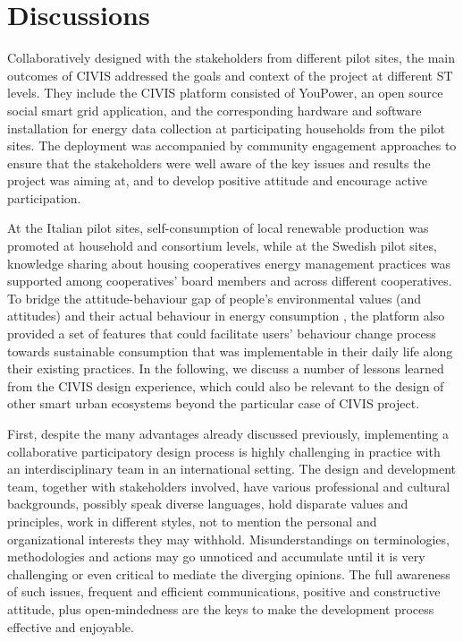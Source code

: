 
\section{Discussions}

Collaboratively designed with the stakeholders from different pilot sites, the main outcomes of CIVIS addressed the goals and context of the project at different ST levels. They include the CIVIS platform consisted of YouPower, an open source social smart grid application, and the corresponding hardware and software installation for energy data collection at participating households from the pilot sites. The   deployment was accompanied by community engagement approaches to ensure that the stakeholders were well aware of the key issues and results the project was aiming at, and to develop positive attitude and encourage active participation. 
% 

At the Italian pilot sites, self-consumption of local renewable production was promoted at household and consortium levels, while at the Swedish pilot sites, knowledge sharing about housing cooperatives energy management practices was supported among cooperatives' board members and across different cooperatives. To bridge the attitude-behaviour gap of people's environmental values (and attitudes) and their actual behaviour in energy consumption \cite{Kollmuss2002,Schultz2002,Schultz2014}, the platform also provided a set of features that could facilitate users' behaviour change process towards sustainable  consumption that was implementable in their daily life along their existing practices. 
% 
In the following, we discuss a number of lessons learned from the CIVIS design experience, which could also be relevant to the design of other smart urban ecosystems beyond the particular case of CIVIS project. 
% 

First, despite the many advantages already discussed previously, implementing a collaborative participatory design process is highly challenging in practice with an interdisciplinary team in an international setting. The design and development team, together with stakeholders involved, have various professional and cultural backgrounds, possibly speak diverse languages, hold disparate values and principles, work in different styles, not to mention the personal and organizational interests they may withhold. Misunderstandings on terminologies,  methodologies and actions may go unnoticed and accumulate until it is very challenging or even critical to mediate the diverging opinions. The full awareness of such issues, frequent and efficient communications,  positive and constructive attitude, plus open-mindedness are the keys to make the development process effective and enjoyable.
% 

